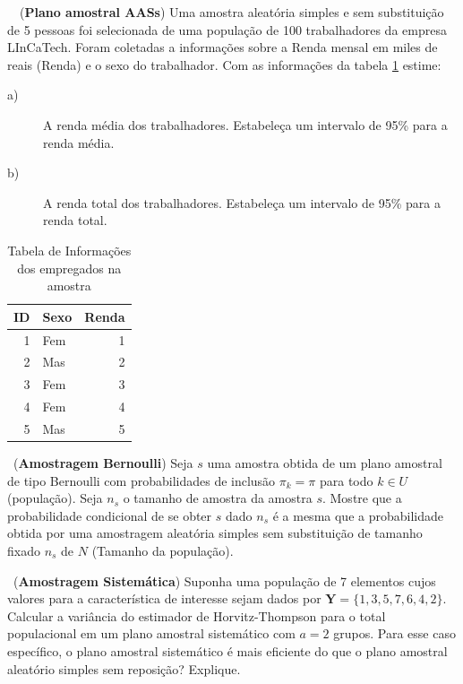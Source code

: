\documentclass[a4paper,11pt,oneside,twocolumn]{Config/milktest}
\begin{document}
\medskip 
\question~~({\bf Plano amostral AASs}) Uma amostra aleatória simples e sem substituição de 5 pessoas foi selecionada de uma população de 100 trabalhadores da empresa LInCaTech. Foram coletadas a informações sobre a Renda mensal em miles de reais (Renda) e o sexo do trabalhador. Com as informações da tabela \ref{ID:Renda} estime:

\begin{description}
    \item[a)] A renda média dos trabalhadores. Estabeleça um intervalo de 95\% para a renda média.
\item[b)] A renda total dos trabalhadores. Estabeleça um intervalo de 95\% para a renda total. 
\end{description}
{\small \begin{table}[H]
\centering
\begin{tabular}{rlr}
  \hline
ID & Sexo & Renda  \\ 
  \hline
    1 & Fem &  1 \\
    2 & Mas &  2\\
    3 & Fem &  3\\
    4 & Fem &  4\\
    5 & Mas &  5\\
 
   \hline
\end{tabular}
\caption{Tabela de Informações dos empregados na amostra} 
\label{ID:Renda}
\end{table}
}




\medskip 
\question~({\bf Amostragem Bernoulli}) Seja $s$ uma amostra obtida de um plano amostral de tipo Bernoulli com probabilidades de inclusão $\pi_k = \pi$ para todo $k \in U$ (população). Seja $n_s$ o tamanho de amostra da amostra $s.$ Mostre que a probabilidade condicional de se obter $s$ dado $n_s$ é a mesma que a probabilidade obtida por uma amostragem aleatória simples sem substituição de tamanho fixado $n_s$ de $N$ (Tamanho da população). 



\medskip
\question~({\bf Amostragem Sistemática}) Suponha uma população de 7 elementos cujos valores para a característica de interesse sejam dados por
$\mathbf{Y} = \{1, 3, 5, 7, 6, 4, 2\}.$ Calcular a variância do estimador de Horvitz-Thompson para o total populacional em um plano amostral sistemático com $a = 2$ grupos. Para esse caso específico, o plano amostral sistemático é mais eficiente do que o plano amostral aleatório simples sem reposição? Explique.
\end{document}
